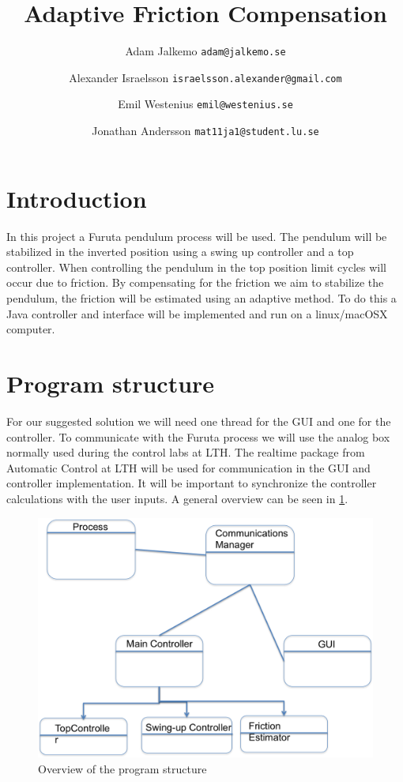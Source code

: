 \documentclass[10pt,a4paper]{article}
\author{Adam Jalkemo \texttt{adam@jalkemo.se} \and
Alexander Israelsson \texttt{israelsson.alexander@gmail.com} \and
Emil Westenius \texttt{emil@westenius.se} \and
Jonathan Andersson \texttt{mat11ja1@student.lu.se}}
\title{Adaptive Friction Compensation}
\begin{document}
\maketitle

\section{Introduction}
In this project a Furuta pendulum process will be used. The pendulum will be stabilized in the inverted position using a swing up controller and a top controller. When controlling the pendulum in the top position limit cycles will occur due to friction. By compensating for the friction we aim to stabilize the pendulum, the friction will be estimated using an adaptive method. To do this a Java controller and interface will be implemented and run on a linux/macOSX computer.
\section{Program structure}
For our suggested solution we will need one thread for the GUI and one for the controller. To communicate with the Furuta process we will use the analog box normally used during the control labs at LTH. The realtime package from Automatic Control at LTH will be used for communication in the GUI and controller implementation. It will be important to synchronize the controller calculations with the user inputs. A general overview can be seen in \ref{fig:uml}.
\begin{figure}
\centerline{
\includegraphics[scale=0.7]{umlfuruta.png}
}
\label{fig:uml}
\caption{Overview of the program structure}
\end{figure}
\end{document}
